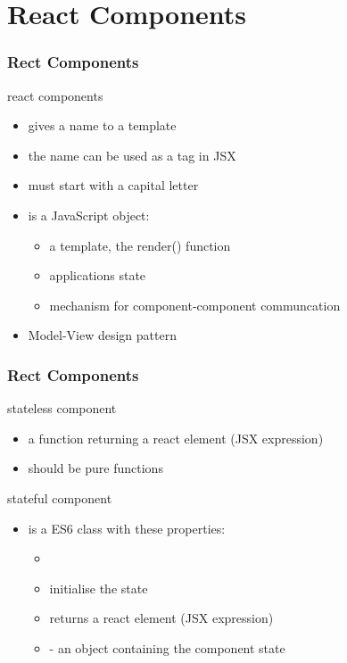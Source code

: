 \section{React Components}
\begin{frame}[fragile] \frametitle{Rect Components}
react components
\begin{itemize}
  \item gives a name to a template
  \item the name can be used as a tag in JSX
  \item must start with a capital letter
  \item is a JavaScript object:
  \begin{itemize}
    \item a template, the render() function
    \item applications state
    \item mechanism for component-component communcation
  \end{itemize}
  \item Model-View design pattern
\end{itemize}
\end{frame}

\begin{frame}[fragile] \frametitle{Rect Components}
stateless component
\begin{itemize}
  \item a function returning a react element (JSX expression)
  \item should be pure functions
\end{itemize}

stateful component
\begin{itemize}
  \item is a ES6 class with these properties:
  \begin{itemize}
    \item {}
    \item {} initialise the state
    \item {} returns a react element (JSX expression)
    \item {} - an object containing the component state
  \end{itemize}
\end{itemize}
\end{frame}

